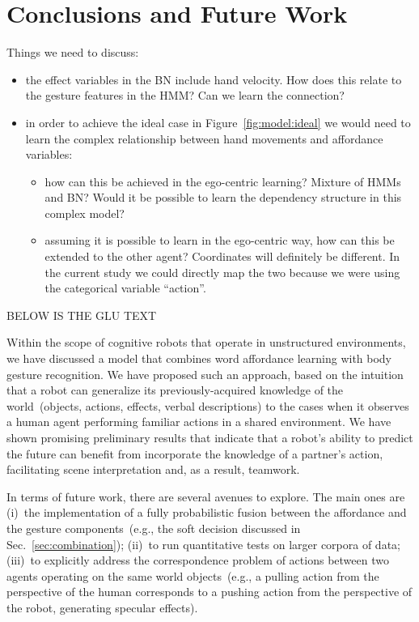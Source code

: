 
\section{Conclusions and Future Work}

Things we need to discuss:
\begin{itemize}
\item the effect variables in the BN include hand velocity. How does this relate to the gesture features in the HMM? Can we learn the connection?
\item in order to achieve the ideal case in Figure~\ref{fig:model:ideal} we would need to learn the complex relationship between hand movements and affordance variables:
  \begin{itemize}
  \item how can this be achieved in the ego-centric learning? Mixture of HMMs and BN? Would it be possible to learn the dependency structure in this complex model?
  \item assuming it is possible to learn in the ego-centric way, how can this be extended to the other agent? Coordinates will definitely be different. In the current study we could directly map the two because we were using the categorical variable ``action''.
  \end{itemize}
\end{itemize}

BELOW IS THE GLU TEXT

Within the scope of cognitive robots that operate in unstructured environments, we have discussed a model that combines word affordance learning with body gesture recognition. We have proposed such an approach, based on the intuition that a robot can generalize its previously-acquired knowledge of the world~(objects, actions, effects, verbal descriptions) to the cases when it observes a human agent performing familiar actions in a shared \hr{} environment. We have shown promising preliminary results that indicate that a robot's ability to predict the future can benefit from incorporate the knowledge of a partner's action, facilitating scene interpretation and, as a result, teamwork.

In terms of future work, there are several avenues to explore. The main ones are (i)~the implementation of a fully probabilistic fusion between the affordance and the gesture components~(e.g., the soft decision discussed in Sec.~\ref{sec:combination}); (ii)~to run quantitative tests on larger corpora of \hr{} data; (iii)~to explicitly address the correspondence problem of actions between two agents operating on the same world objects~(e.g., a pulling action from the perspective of the human corresponds to a pushing action from the perspective of the robot, generating specular effects).
